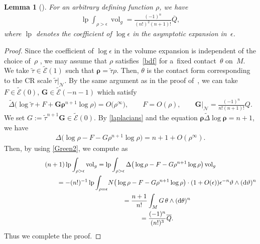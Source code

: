 \documentclass[10pt,a4paper]{amsart}
\numberwithin{equation}{section}
\newtheorem{Lemma}[Theorem]{Lemma}
\begin{document}
\begin{Lemma}[{\cite[Proposition~A.3]{Seshadri}}]\label{Q-lp}
For an arbitrary defining function $\rho$, we have
\begin{gather*}
\operatorname{lp}\int_{\rho>\epsilon} \operatorname{vol}_g=\frac{(-1)^n}{(n!)^2(n+1)!}\overline{Q},
\end{gather*}
where $\operatorname{lp}$ denotes the coefficient of $\log\epsilon$ in the asymptotic expansion in~$\epsilon$.
\end{Lemma}
\begin{proof}
Since the coef\/f\/icient of $\log\epsilon$ in the volume expansion is independent of the choice of~$\rho$ \cite[Proposition~4.1]{Seshadri}, we may assume that $\rho$ satisf\/ies~\eqref{bdf} for a~f\/ixed contact~$\theta$ on~$M$. We take $\widetilde\tau\in\widetilde{\mathcal{E}}(1)$ such that $\boldsymbol\rho=\widetilde\tau\rho$. Then, $\theta$ is the contact form corresponding to the CR scale $\widetilde\tau|_{\mathcal{N}}$.
By the same argument as in the proof of~\cite[Lemma~3.1]{Hirachi}, we can take $F\in\widetilde{\mathcal{E}}(0)$, $\boldsymbol{G}\in\widetilde{\mathcal{E}} (-n-1)$ which satisfy
\begin{gather*}
\widetilde{\Delta}\big(\log\widetilde\tau+F+\boldsymbol{G}\boldsymbol{\rho}^{n+1}\log\rho\big)=O\big(\rho^\infty\big), \qquad
F=O(\rho), \qquad \boldsymbol{G}|_\mathcal{N}=\frac{(-1)^n}{n!(n+1)!}Q.
\end{gather*}
We set $G:=\widetilde{\tau}^{n+1}\boldsymbol{G}\in\widetilde{\mathcal{E}}(0)$. By \eqref{laplacians} and the equation $\boldsymbol\rho\widetilde\Delta\log\boldsymbol\rho=n+1$, we have
\begin{gather*}
\Delta\big(\log\rho-F-G\rho^{n+1}\log\rho\big)=n+1+O(\rho^\infty).
\end{gather*}
Then, by using \eqref{Green2}, we compute as
\begin{gather*}
(n+1) \operatorname{lp}\int_{\rho>\epsilon} \operatorname{vol}_g
 =\operatorname{lp}\int_{\rho>\epsilon}\Delta\big(\log\rho-F-G\rho^{n+1}\log\rho\big)\operatorname{vol}_g \\
\hphantom{(n+1) \operatorname{lp}\int_{\rho>\epsilon} \operatorname{vol}_g}{}
=-(n!)^{-1}\operatorname{lp}\int_{\rho=\epsilon}\! N\big(\log\rho-F-G\rho^{n+1}\log\rho\big) \cdot (1+O(\epsilon))\epsilon^{-n} \vartheta\wedge({\rm d}\vartheta)^n \\
\hphantom{(n+1) \operatorname{lp}\int_{\rho>\epsilon} \operatorname{vol}_g}{}
=\frac{n+1}{n!}\int_M G\,\theta\wedge({\rm d}\theta)^n \\
\hphantom{(n+1) \operatorname{lp}\int_{\rho>\epsilon} \operatorname{vol}_g}{}
=\frac{(-1)^n}{(n!)^3} \overline{Q}.
\end{gather*}
Thus we complete the proof.
\end{proof}
\end{document}

